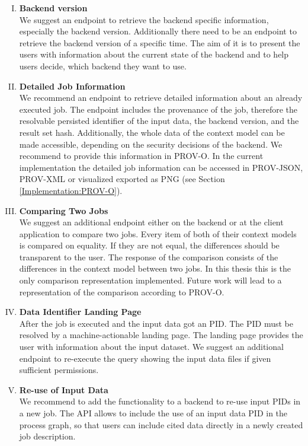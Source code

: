 \documentclass[draft,final]{vutinfth} %
\newcommand{\bgoesswein}[1]{{\color{blue}#1}}
\begin{document}
\begin{enumerate}[I.]
\item \textbf{Backend version} \\
	We suggest an endpoint to retrieve the backend specific information, especially the backend version. Additionally there need to be an endpoint to retrieve the backend version of a specific time. The aim of it is to present the users with information about the current state of the backend and to help users decide, which backend they want to use. 

\item \textbf{Detailed Job Information} \\
	We recommend an endpoint to retrieve detailed information about an already executed job. The endpoint includes the provenance of the job, therefore the resolvable persisted identifier of the input data, the backend version, and the result set hash. Additionally, the whole data of the context model can be made accessible, depending on the security decisions of the backend. \bgoesswein{We recommend to provide this information in PROV-O. In the current implementation the detailed job information can be accessed in PROV-JSON, PROV-XML or visualized exported as PNG (see Section \ref{Implementation:PROV-O}).}   
\item \textbf{Comparing Two Jobs} \\
	We suggest an additional endpoint either on the backend or at the client application to compare two jobs. Every item of both of their context models is compared on equality. If they are not equal, the differences should be transparent to the user. The response of the comparison consists of the differences in the context model between two jobs. \bgoesswein{In this thesis this is the only comparison representation implemented. Future work will lead to a representation of the comparison according to PROV-O.}
\newpage
\item \textbf{Data Identifier Landing Page} \\
	After the job is executed and the input data got an PID. The PID must be resolved by a \bgoesswein{machine-actionable} landing page. The landing page provides the user with information about the input dataset. We suggest an additional endpoint to re-execute the query showing the input data files if given sufficient permissions.
    
\item \textbf{Re-use of Input Data} \\
	We recommend to add the functionality to a backend to re-use input PIDs in a new job. The API allows to include the use of an input data PID in the process graph, so that users can include cited data directly in a newly created job description.   
\end{enumerate}
\end{document}
